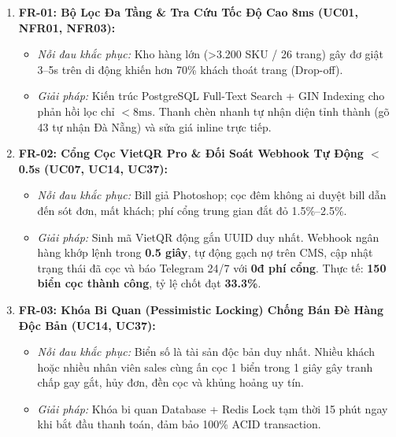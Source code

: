 \documentclass[11pt,a4paper]{article}
\begin{document}
\vspace{1mm}
\begin{tcolorbox}[colback=white,colframe=primary,arc=1.8mm,boxrule=0.7pt,top=2mm,bottom=2mm,left=2mm,right=2mm]
\small
\begin{enumerate}[leftmargin=*,itemsep=4.5pt,topsep=0pt]
    \item \textbf{FR-01: Bộ Lọc Đa Tầng \& Tra Cứu Tốc Độ Cao 8ms (UC01, NFR01, NFR03):}
    \begin{itemize}[itemsep=1.5pt,topsep=1pt]
        \item \textit{Nỗi đau khắc phục:} Kho hàng lớn (>3.200 SKU / 26 trang) gây đơ giật 3--5s trên di động khiến hơn 70\% khách thoát trang (Drop-off).
        \item \textit{Giải pháp:} Kiến trúc PostgreSQL Full-Text Search + GIN Indexing cho phản hồi lọc chỉ \textbf{$<8\text{ms}$}. Thanh chèn nhanh tự nhận diện tỉnh thành (gõ 43 tự nhận Đà Nẵng) và sửa giá inline trực tiếp.
    \end{itemize}

    \item \textbf{FR-02: Cổng Cọc VietQR Pro \& Đối Soát Webhook Tự Động $<$0.5s (UC07, UC14, UC37):}
    \begin{itemize}[itemsep=1.5pt,topsep=1pt]
        \item \textit{Nỗi đau khắc phục:} Bill giả Photoshop; cọc đêm không ai duyệt bill dẫn đến sót đơn, mất khách; phí cổng trung gian đắt đỏ 1.5\%--2.5\%.
        \item \textit{Giải pháp:} Sinh mã VietQR động gắn UUID duy nhất. Webhook ngân hàng khớp lệnh trong \textbf{0.5 giây}, tự động gạch nợ trên CMS, cập nhật trạng thái đã cọc và báo Telegram 24/7 với \textbf{0đ phí cổng}. Thực tế: \textbf{150 biển cọc thành công}, tỷ lệ chốt đạt \textbf{33.3\%}.
    \end{itemize}

    \item \textbf{FR-03: Khóa Bi Quan (Pessimistic Locking) Chống Bán Đè Hàng Độc Bản (UC14, UC37):}
    \begin{itemize}[itemsep=1.5pt,topsep=1pt]
        \item \textit{Nỗi đau khắc phục:} Biển số là tài sản độc bản duy nhất. Nhiều khách hoặc nhiều nhân viên sales cùng ấn cọc 1 biển trong 1 giây gây tranh chấp gay gắt, hủy đơn, đền cọc và khủng hoảng uy tín.
        \item \textit{Giải pháp:} Khóa bi quan Database + Redis Lock tạm thời 15 phút ngay khi bắt đầu thanh toán, đảm bảo 100\% ACID transaction.
    \end{itemize}


\end{enumerate}
\end{tcolorbox}
\end{document}
